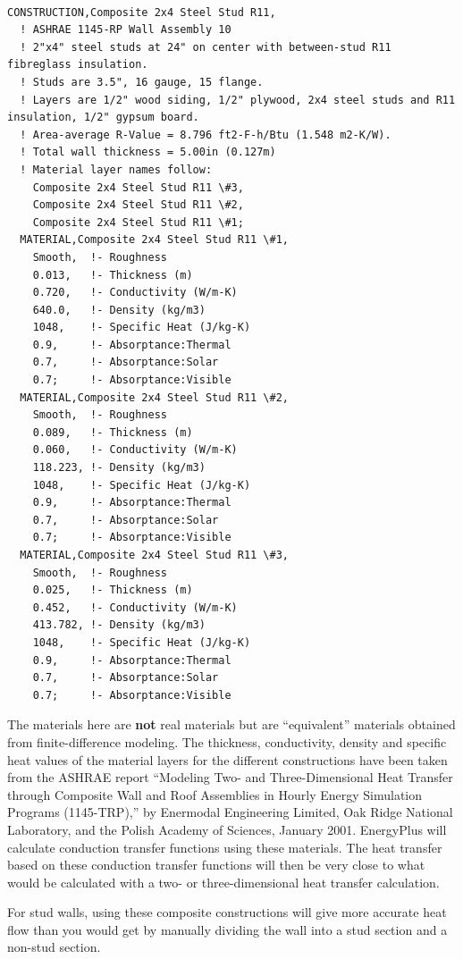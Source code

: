 \begin{lstlisting}

CONSTRUCTION,Composite 2x4 Steel Stud R11,
  ! ASHRAE 1145-RP Wall Assembly 10
  ! 2"x4" steel studs at 24" on center with between-stud R11 fibreglass insulation.
  ! Studs are 3.5", 16 gauge, 15 flange.
  ! Layers are 1/2" wood siding, 1/2" plywood, 2x4 steel studs and R11 insulation, 1/2" gypsum board.
  ! Area-average R-Value = 8.796 ft2-F-h/Btu (1.548 m2-K/W).
  ! Total wall thickness = 5.00in (0.127m)
  ! Material layer names follow:
    Composite 2x4 Steel Stud R11 \#3,
    Composite 2x4 Steel Stud R11 \#2,
    Composite 2x4 Steel Stud R11 \#1;
  MATERIAL,Composite 2x4 Steel Stud R11 \#1,
    Smooth,  !- Roughness
    0.013,   !- Thickness (m)
    0.720,   !- Conductivity (W/m-K)
    640.0,   !- Density (kg/m3)
    1048,    !- Specific Heat (J/kg-K)
    0.9,     !- Absorptance:Thermal
    0.7,     !- Absorptance:Solar
    0.7;     !- Absorptance:Visible
  MATERIAL,Composite 2x4 Steel Stud R11 \#2,
    Smooth,  !- Roughness
    0.089,   !- Thickness (m)
    0.060,   !- Conductivity (W/m-K)
    118.223, !- Density (kg/m3)
    1048,    !- Specific Heat (J/kg-K)
    0.9,     !- Absorptance:Thermal
    0.7,     !- Absorptance:Solar
    0.7;     !- Absorptance:Visible
  MATERIAL,Composite 2x4 Steel Stud R11 \#3,
    Smooth,  !- Roughness
    0.025,   !- Thickness (m)
    0.452,   !- Conductivity (W/m-K)
    413.782, !- Density (kg/m3)
    1048,    !- Specific Heat (J/kg-K)
    0.9,     !- Absorptance:Thermal
    0.7,     !- Absorptance:Solar
    0.7;     !- Absorptance:Visible
\end{lstlisting}

The materials here are \textbf{not} real materials but are ``equivalent'' materials obtained from finite-difference modeling. The thickness, conductivity, density and specific heat values of the material layers for the different constructions have been taken from the ASHRAE report ``Modeling Two- and Three-Dimensional Heat Transfer through Composite Wall and Roof Assemblies in Hourly Energy Simulation Programs (1145-TRP),'' by Enermodal Engineering Limited, Oak Ridge National Laboratory, and the Polish Academy of Sciences, January 2001. EnergyPlus will calculate conduction transfer functions using these materials. The heat transfer based on these conduction transfer functions will then be very close to what would be calculated with a two- or three-dimensional heat transfer calculation.

For stud walls, using these composite constructions will give more accurate heat flow than you would get by manually dividing the wall into a stud section and a non-stud section.


